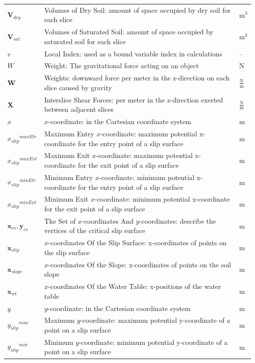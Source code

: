 \documentclass[12pt]{article}
\begin{document}
\begin{longtabu}{l X[l] l}
\\
${\mathbf{V}_{dry}}$ & Volumes of Dry Soil: amount of space occupied by dry soil for each slice & $\text{m}^{3}$
\\
${\mathbf{V}_{sat}}$ & Volumes of Saturated Soil: amount of space occupied by saturated soil for each slice & $\text{m}^{3}$
\\
$v$ & Local Index: used as a bound variable index in calculations & --
\\
$W$ & Weight: The gravitational force acting on an object & N
\\
$\mathbf{W}$ & Weights: downward force per meter in the z-direction on each slice caused by gravity & $\frac{\text{N}}{\text{m}}$
\\
$\mathbf{X}$ & Interslice Shear Forces: per meter in the z-direction exerted between adjacent slices & $\frac{\text{N}}{\text{m}}$
\\
$x$ & $x$-coordinate: in the Cartesian coordinate system & m
\\
${{x_{slip}}^{maxEtr}}$ & Maximum Entry $x$-coordinate: maximum potential x-coordinate for the entry point of a slip surface & m
\\
${{x_{slip}}^{maxExt}}$ & Maximum Exit $x$-coordinate: maximum potential x-coordinate for the exit point of a slip surface & m
\\
${{x_{slip}}^{minEtr}}$ & Minimum Entry $x$-coordinate: minimum potential x-coordinate for the entry point of a slip surface & m
\\
${{x_{slip}}^{minExt}}$ & Minimum Exit $x$-coordinate: minimum potential x-coordinate for the exit point of a slip surface & m
\\
${\mathbf{x}_{cs}},{\mathbf{y}_{cs}}$ & The Set of $x$-coordinates And $y$-coordinates: describe the vertices of the critical slip surface & m
\\
${\mathbf{x}_{slip}}$ & $x$-coordinates Of the Slip Surface: x-coordinates of points on the slip surface & m
\\
${\mathbf{x}_{slope}}$ & $x$-coordinates Of the Slope: x-coordinates of points on the soil slope & m
\\
${\mathbf{x}_{wt}}$ & $x$-coordinates Of the Water Table: x-positions of the water table & m
\\
$y$ & $y$-coordinate: in the Cartesian coordinate system & m
\\
${{y_{slip}}^{max}}$ & Maximum $y$-coordinate: maximum potential y-coordinate of a point on a slip surface & m
\\
${{y_{slip}}^{min}}$ & Minimum $y$-coordinate: minimum potential y-coordinate of a point on a slip surface & m

\end{longtabu}
\end{document}

